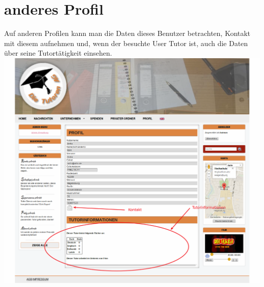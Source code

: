 
\section{anderes Profil}
Auf anderen Profilen kann man die Daten dieses Benutzer betrachten, Kontakt mit diesem aufnehmen und, wenn der besuchte User Tutor ist, auch die Daten über seine Tutortätigkeit einsehen.\\
\includegraphics[width=1\textwidth]{../Screenshots/de/Profil_bearbeiten_fremdes}